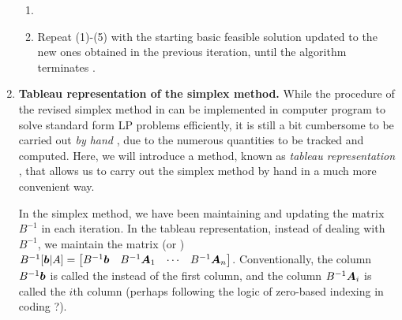 \begin{enumerate}
\begin{enumerate}[label={(\arabic*)}]
\item {}
\item Repeat (1)-(5) with the starting basic feasible solution  updated to the new ones obtained in the previous
iteration, until the algorithm terminates .
\end{enumerate}
\item \textbf{Tableau representation of the simplex method.} While the
procedure of the revised simplex method in 
can be implemented in computer program  to solve standard form LP
problems efficiently, it is still a bit cumbersome to be carried out \emph{by
hand} , due to the numerous quantities to be tracked and computed.
Here, we will introduce a method, known as \emph{tableau representation}
, that allows us to carry out the simplex method by hand in a
much more convenient way.

In the simplex method, we have been maintaining and updating the matrix
\(B^{-1}\) in each iteration. In the tableau representation, instead of dealing
with \(B^{-1}\), we maintain the matrix (or )
\(B^{-1}[\bm{b}|A]
=\begin{bmatrix}B^{-1}\bm{b}&B^{-1}\bm{A}_1&\cdots&B^{-1}\bm{A}_n\end{bmatrix}\).
Conventionally, the column \(B^{-1}\bm{b}\) is called the  instead of the first column, and the column \(B^{-1}\bm{A}_i\) is
called the \(i\)th column (perhaps following the logic of zero-based indexing
in coding ?).


\end{enumerate}
